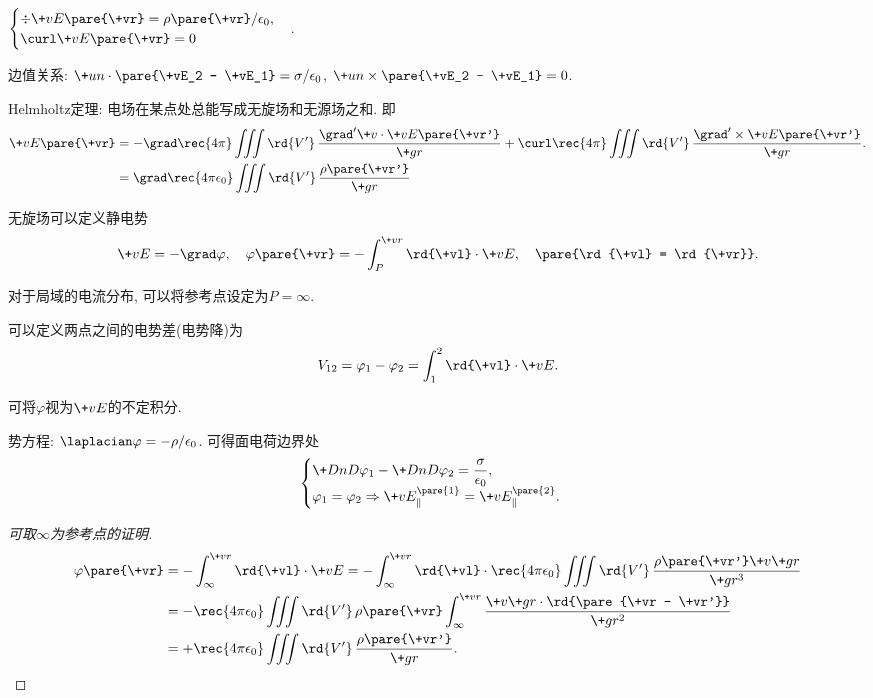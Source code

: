 \documentclass[hidelinks]{ctexart}
\begin{document}
$\begin{cases}
    \div \+vE\pare{\+vr} = \rho\pare{\+vr}/\epsilon_0,\\
    \curl \+vE\pare{\+vr} = 0
\end{cases}$.
\begin{cenum}
    \item 边值关系: $\+un\cdot \pare{\+vE_2 - \+vE_1} = \sigma/\epsilon_0$, $\+un\times \pare{\+vE_2 - \+vE_1} = 0$.
    \item Helmholtz定理: 电场在某点处总能写成无旋场和无源场之和. 即
    \begin{align*}
        \+vE\pare{\+vr} &= -\grad \rec{4\pi} \iiint \rd{V'}\, \frac{\grad'\+v\cdot \+vE\pare{\+vr'}}{\+gr} + \curl \rec{4\pi} \iiint \rd{V'}\, \frac{\grad'\times \+vE\pare{\+vr'}}{\+gr}. \\
        &= \grad \rec{4\pi\epsilon_0} \iiint \rd{V'}\, \frac{\rho\pare{\+vr'}}{\+gr}
    \end{align*}
    \item 无旋场可以定义静电势
    \[ \+vE = -\grad \varphi,\quad \varphi\pare{\+vr} = -\int_P^{\+vr} \rd{\+vl}\cdot \+vE,\quad \pare{\rd{\+vl} = \rd{\+vr}}. \]
    \begin{cenum}
        \item 对于局域的电流分布, 可以将参考点设定为$P=\infty$.
        \item 可以定义两点之间的电势差(电势降)为
        \[ V_{12} = \varphi_1 - \varphi_2 = \int_1^2 \rd{\+vl}\cdot \+vE. \]
        \item 可将$\varphi$视为$\+vE$的不定积分.
    \end{cenum}
    \item 势方程: $\laplacian \varphi = -\rho/\epsilon_0$. 可得面电荷边界处
    \[ \begin{cases}
        \displaystyle \+DnD{\varphi_1} - \+DnD{\varphi_2} = \frac{\sigma}{\epsilon_0},\\
        \displaystyle \varphi_1 = \varphi_2 \Rightarrow \+vE_{\parallel}^{\pare{1}} = \+vE_{\parallel}^{\pare{2}}.
    \end{cases} \]
\end{cenum}
\begin{proof}[可取$\infty$为参考点的证明]
    \begin{align*}
        \varphi\pare{\+vr} &= -\int_\infty^{\+vr} \rd{\+vl}\cdot \+vE = -\int_\infty^{\+vr} \rd{\+vl}\cdot \rec{4\pi\epsilon_0} \iiint \rd{V'}\, \frac{\rho\pare{\+vr'}\+v{\+gr}}{\+gr^3} \\
        &= -\rec{4\pi\epsilon_0} \iiint \rd{V'}\, \rho\pare{\+vr} \int_\infty^{\+vr} \frac{\+v{\+gr}\cdot\rd{\pare{\+vr - \+vr'}}}{\+gr^2} \\
        &= + \rec{4\pi\epsilon_0} \iiint \rd{V'}\, \frac{\rho\pare{\+vr'}}{\+gr}. \qedhere
    \end{align*}
\end{proof}
\end{document}
